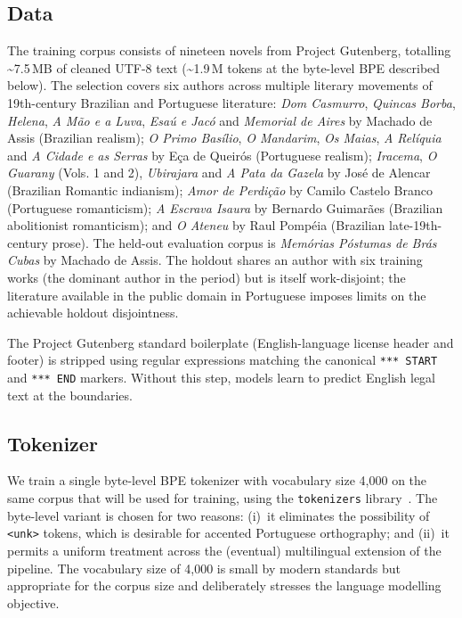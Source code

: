 \documentclass[11pt]{article}
\begin{document}
\subsection{Data}

The training corpus consists of nineteen novels from Project Gutenberg,
totalling \textasciitilde 7.5\,MB of cleaned UTF-8 text
(\textasciitilde 1.9\,M tokens at the byte-level BPE described below).
The selection covers six authors across multiple literary movements of
19th-century Brazilian and Portuguese literature: \emph{Dom Casmurro},
\emph{Quincas Borba}, \emph{Helena}, \emph{A Mão e a Luva},
\emph{Esaú e Jacó} and \emph{Memorial de Aires} by Machado de Assis
(Brazilian realism); \emph{O Primo Basílio}, \emph{O Mandarim},
\emph{Os Maias}, \emph{A Relíquia} and \emph{A Cidade e as Serras} by
Eça de Queirós (Portuguese realism); \emph{Iracema}, \emph{O Guarany}
(Vols. 1 and 2), \emph{Ubirajara} and \emph{A Pata da Gazela} by José
de Alencar (Brazilian Romantic indianism); \emph{Amor de Perdição} by
Camilo Castelo Branco (Portuguese romanticism); \emph{A Escrava Isaura}
by Bernardo Guimarães (Brazilian abolitionist romanticism); and \emph{O
Ateneu} by Raul Pompéia (Brazilian late-19th-century prose). The
held-out evaluation corpus is \emph{Memórias Póstumas de Brás Cubas}
by Machado de Assis. The holdout shares an author with six training
works (the dominant author in the period) but is itself work-disjoint;
the literature available in the public domain in Portuguese imposes
limits on the achievable holdout disjointness.

The Project Gutenberg standard boilerplate (English-language license
header and footer) is stripped using regular expressions matching the
canonical \texttt{*** START} and \texttt{*** END} markers. Without this
step, models learn to predict English legal text at the boundaries.

\subsection{Tokenizer}

We train a single byte-level BPE tokenizer with vocabulary size 4{,}000
on the same corpus that will be used for training, using the
\texttt{tokenizers} library~\cite{huggingfacetokenizers}. The byte-level
variant is chosen for two reasons: (i)~it eliminates the possibility of
\texttt{<unk>} tokens, which is desirable for accented Portuguese
orthography; and (ii)~it permits a uniform treatment across the (eventual)
multilingual extension of the pipeline. The vocabulary size of 4{,}000
is small by modern standards but appropriate for the corpus size and
deliberately stresses the language modelling objective.
\end{document}

